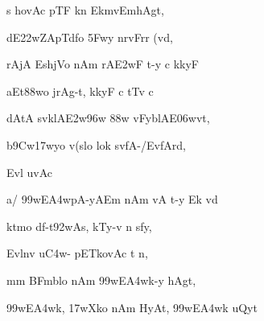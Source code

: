 {\dn s hovAc pTF k\?n Ekmv\0EmhAgt,{\dandabdn} \dontdisplaylinenum}

{\dn dE\322wZApTd\?fo \35Fwy\2 nrvFrr\2 (vd, \vegdn\dontdisplaylinenum}

{\dn rAjA Es\2hjVo nAm rA\3E2wF t-y c k\?kyF{\dandabdn} \dontdisplaylinenum}

{\dn aEt\388wo jrAg\5-t, k\?kyF c tT\4v c \vegdn\dontdisplaylinenum}

{\dn dAtA sv\0klA\3E2w\396w \388w\? vFy\0blAE\306wvt,{\dandabdn} \dontdisplaylinenum}

{\dn b\5\39Cw\317wyo v(slo lok\? sv\0fA-/EvfArd, \vegdn\dontdisplaylinenum}

{\dn Evl uvAc{\dandabdn}\dontdisplaylinenum }

{\dn a/ \399w\?E\3A4wpA-yAEm nAm vA t-y Ek\2 vd{\dandadn} \dontdisplaylinenum}

{\dn ktmo d\?f-t\392wAs, kTy-v n s\2fy, \vegdn\dontdisplaylinenum}

{\dn Evl\?n\4v u\3C4w- pETkovAc t\2 n,{\dandabdn} \dontdisplaylinenum}

{\dn mm BFmblo nAm \399w\?E\3A4wk-y hAgt, \vegdn\dontdisplaylinenum}

{\dn \399w\?E\3A4wk, \317wXko nAm HyAt, \399w\?E\3A4wk uQyt\?{\dandabdn} \dontdisplaylinenum}

